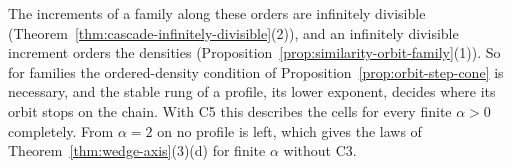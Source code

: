 The increments of a family along these orders are infinitely divisible (Theorem~\ref{thm:cascade-infinitely-divisible}(2)),
and an infinitely divisible increment orders the \Levy{} densities
(Proposition~\ref{prop:similarity-orbit-family}(1)). So for families the ordered-density condition of
Proposition~\ref{prop:orbit-step-cone} is necessary, and the stable rung of a profile, its lower exponent, decides
where its orbit stops on the chain. With C5 this describes the cells for every finite $\alpha > 0$ completely.
From $\alpha = 2$ on no profile is left, which gives the laws of Theorem~\ref{thm:wedge-axis}(3)(d) for finite
$\alpha$ without C3.

